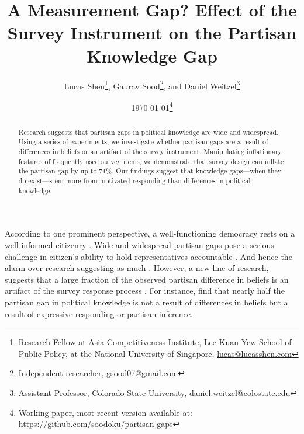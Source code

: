 \documentclass[12pt, letterpaper]{article}
\title{A Measurement Gap? Effect of the Survey Instrument on the Partisan Knowledge Gap}
\author{Lucas Shen\thanks{Research Fellow at Asia Competitiveness Institute, Lee Kuan Yew School of Public Policy, at the National University of Singapore, \href{lucas@lucasshen.com}{lucas@lucasshen.com}},
	Gaurav Sood\thanks{Independent researcher, \href{gsood07@gmail.com}{gsood07@gmail.com}}, and
	Daniel Weitzel\thanks{Assistant Professor, Colorado State University, \href{mailto:daniel.weitzel@colostate.edu}{daniel.weitzel@colostate.edu}}}
\date{\today \thanks{Working paper, most recent version available at: \href{https://github.com/soodoku/partisan-gaps}{https://github.com/soodoku/partisan-gaps}}}
\begin{document}
	\maketitle
	\thispagestyle{empty}
	
	\begin{abstract}
		
		\noindent Research suggests that partisan gaps in political knowledge are wide and widespread. Using a series of experiments, we investigate whether partisan gaps are a result of differences in beliefs or an artifact of the survey instrument. Manipulating inflationary features of frequently used survey items, we demonstrate that survey design can inflate the partisan gap by up to 71\%. Our findings suggest that knowledge gaps---when they do exist---stem more from motivated responding than differences in political knowledge.
	\end{abstract}
	
	\vspace{.2in}
	
	
	\newpage
	
	\doublespacing
	
	According to one prominent perspective, a well-functioning democracy rests on a well informed citizenry \citep{schattschneider-1960}. Wide and  widespread partisan gaps pose a serious challenge in citizen's ability to hold representatives accountable \citep{hochschild2015isn}. And hence the alarm over research suggesting as much \citep{bartels_2002, campbell1980american, jerit2012partisan}. However, a new line of research, suggests that a large fraction of the observed partisan difference in beliefs is an artifact of the survey response process \citep{bullocketal_2015,huber_yair_2018, prior2015you}. For instance, \cite{bullocketal_2015} find that nearly half the partisan gap in political knowledge is not a result of differences in beliefs but a result of expressive responding or partisan inference.
	
\end{document}
